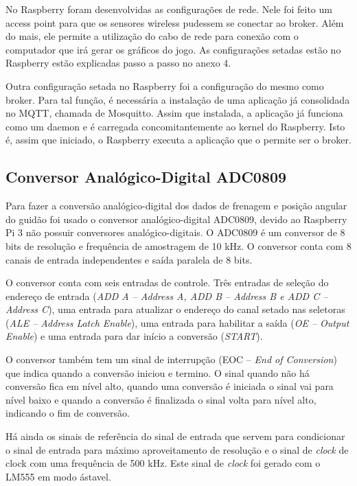 No Raspberry foram desenvolvidas as configurações de rede. Nele foi feito um access point para que os sensores wireless pudessem se conectar ao broker. Além do mais, ele permite a utilização do cabo de rede para conexão com o computador que irá gerar os gráficos do jogo. As configurações setadas estão no Raspberry estão explicadas passo a passo no anexo 4.

Outra configuração setada no Raspberry foi a configuração do mesmo como broker. Para tal função, é necessária a instalação de uma aplicação já consolidada no MQTT, chamada de Mosquitto. Assim que instalada, a aplicação já funciona como um daemon e é carregada concomitantemente ao kernel do Raspberry. Isto é, assim que iniciado, o Raspberry executa a aplicação que o permite ser o broker.


\subsection{Conversor Analógico-Digital ADC0809}

	Para fazer a conversão analógico-digital dos dados de frenagem e posição angular do guidão foi usado o conversor analógico-digital ADC0809, devido ao Raspberry Pi 3 não possuir conversores analógico-digitais. O ADC0809 é um conversor de 8 bits de resolução e frequência de amostragem de 10 kHz. O conversor conta com 8 canais de entrada independentes e saída paralela de 8 bits.

	O conversor conta com seis entradas de controle. Três entradas de seleção do endereço de entrada (\textit{ADD A – Address A, ADD B – Address B e ADD C – Address C}), uma entrada para atualizar o endereço do canal setado nas seletoras (\textit{ALE – Address Latch Enable}), uma entrada para habilitar a saída (\textit{OE – Output Enable}) e uma entrada para dar início a conversão (\textit{START}).

	O conversor também tem um sinal de interrupção (EOC – \textit{End of Conversion}) que indica quando a conversão iniciou e termino. O sinal quando não há conversão fica em nível alto, quando uma conversão é iniciada o sinal vai para nível baixo e quando a conversão é finalizada o sinal volta para nível alto, indicando o fim de conversão.

	Há ainda os sinais de referência do sinal de entrada que servem para condicionar o sinal de entrada para máximo aproveitamento de resolução e o sinal de \textit{clock} de clock com uma frequência de 500 kHz. Este sinal de \textit{clock} foi gerado com o LM555 em modo ástavel.

